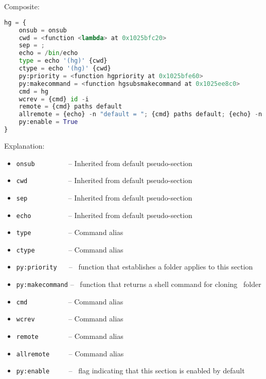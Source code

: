 \subsubsection*{\hg\ \Linux}

Composite:

\begin{snugshade}
\begin{lstlisting}[language=python]
hg = {
	onsub = onsub
	cwd = <function <lambda> at 0x1025bfc20>
	sep = ;
	echo = /bin/echo
	type = echo '(hg)' {cwd}
	ctype = echo '(hg)' {cwd}
	py:priority = <function hgpriority at 0x1025bfe60>
	py:makecommand = <function hgsubsmakecommand at 0x1025ee8c0>
	cmd = hg
	wcrev = {cmd} id -i
	remote = {cmd} paths default
	allremote = {echo} -n "default = "; {cmd} paths default; {echo} -n "default-push = "; {cmd} paths default-push; {echo} -n "default-pull = "; {cmd} paths default-pull
	py:enable = True
}
\end{lstlisting}
\end{snugshade}

Explanation:

\begin{itemize}
\item \lstinline{onsub} ~~~~~~~~ -- Inherited from default pseudo-section
\item \lstinline{cwd} ~~~~~~~~~~ -- Inherited from default pseudo-section
\item \lstinline{sep} ~~~~~~~~~~ -- Inherited from default pseudo-section
\item \lstinline{echo} ~~~~~~~~~ -- Inherited from default pseudo-section
\item \lstinline{type} ~~~~~~~~~ -- Command alias
\item \lstinline{ctype} ~~~~~~~~ -- Command alias
\item \lstinline{py:priority} ~~ -- \Python\ function that establishes a folder applies to this section
\item \lstinline{py:makecommand} -- \Python\ function that returns a shell command for cloning \hg\ folder
\item \lstinline{cmd} ~~~~~~~~~~ -- Command alias
\item \lstinline{wcrev} ~~~~~~~~ -- Command alias
\item \lstinline{remote} ~~~~~~~ -- Command alias
\item \lstinline{allremote} ~~~~ -- Command alias
\item \lstinline{py:enable} ~~~~ -- \Python\ flag indicating that this section is enabled by default
\end{itemize}

